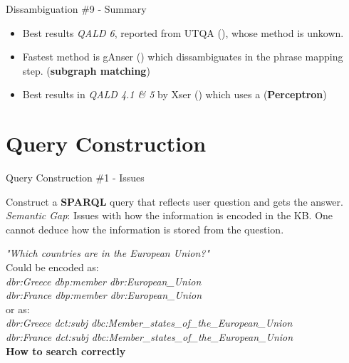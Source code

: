 \documentclass{beamer}
\begin{document}
\begin{frame}{Dissambiguation \#9 - Summary}
  \begin{card}
    \begin{itemize}
      \item Best results \textit{QALD 6}, reported from UTQA (\cite{pouran2016a}), whose method is unkown.
      \item Fastest method is gAnser (\cite{zou2014a}) which dissambiguates in the phrase mapping step. (\textbf{subgraph matching})
      \item Best results in \textit{QALD 4.1 \& 5} by Xser (\cite{zou2014a}) which uses a (\textbf{Perceptron})
    \end{itemize}
  \end{card}
\end{frame}

\note{}

\section{Query Construction}

\begin{frame}{Query Construction \#1 - Issues}
  \begin{cardTiny}
    Construct a \textbf{SPARQL} query that reflects user question and gets the answer. \\
    \textit{Semantic Gap}: Issues with how the information is encoded in the KB\@. One cannot deduce how the information is stored from the question.
  \end{cardTiny}
  \begin{cardTiny}
    \textit{"Which countries are in the European Union?"} \\
    Could be encoded as: \\
    \textit{dbr:Greece dbp:member dbr:European\_Union} \\
    \textit{dbr:France dbp:member dbr:European\_Union} \\
    or as: \\
    \textit{dbr:Greece dct:subj dbc:Member\_states\_of\_the\_European\_Union} \\
    \textit{dbr:France dct:subj dbc:Member\_states\_of\_the\_European\_Union} \\
    \textbf{How to search correctly}
  \end{cardTiny}
\end{frame}

\note{}
\end{document}
